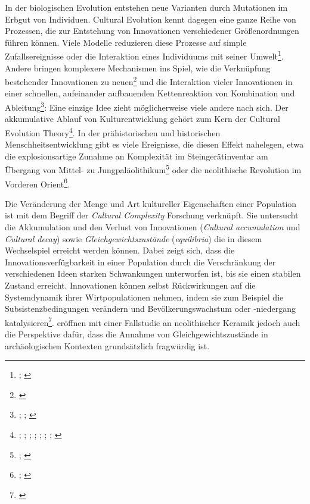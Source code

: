\documentclass[openany,twoside,twocolumn]{book}
\let\rmarkdownfootnote\footnote%
\def\footnote{\protect\rmarkdownfootnote}
\begin{document}
In der biologischen Evolution entstehen neue Varianten durch Mutationen
im Erbgut von Individuen. Cultural Evolution kennt dagegen eine ganze
Reihe von Prozessen, die zur Entstehung von Innovationen verschiedener
Größenordnungen führen können. Viele Modelle reduzieren diese Prozesse
auf simple Zufallsereignisse oder die Interaktion eines Individuums mit
seiner Umwelt\footnote{\textcite{henrich_evolution_2003};
  \textcite{rendell_why_2010}}. Andere bringen komplexere Mechanismen
ins Spiel, wie die Verknüpfung bestehender Innovationen zu
neuen\footnote{\textcite{enquist_why_2008}} und die Interaktion vieler
Innovationen in einer schnellen, aufeinander aufbauenden Kettenreaktion
von Kombination und Ableitung\footnote{\textcite{fogarty_cultural_2015};
  \textcite{kolodny_evolution_2015};
  \textcite{kolodny_game-changing_2016}}: Eine einzige Idee zieht
möglicherweise viele andere nach sich. Der akkumulative Ablauf von
Kulturentwicklung gehört zum Kern der Cultural Evolution
Theory\footnote{\textcite{basalla_evolution_1988};
  \textcite{boyd_culture_1985}; \textcite{boyd_evolutionary_1988};
  \textcite{cavalli-sforza_cultural_1981};
  \textcite{durham_adaptive_1976}; \textcite{feldman_gene-culture_1996};
  \textcite{henrich_evolution_2003}; \textcite{lumsden_genes_1981}}. In
der prähistorischen und historischen Menschheitsentwicklung gibt es
viele Ereignisse, die diesen Effekt nahelegen, etwa die explosionsartige
Zunahme an Komplexität im Steingerätinventar am Übergang von Mittel- zu
Jungpaläolithikum\footnote{\textcite{bar-yosef_nature_1998};
  \textcite{roebroeks_time_2008}} oder die neolithische Revolution im
Vorderen Orient\footnote{\textcite{gopher_when_2001};
  \textcite{veen_agricultural_2010}}.

Die Veränderung der Menge und Art kultureller Eigenschaften einer
Population ist mit dem Begriff der \emph{Cultural Complexity} Forschung
verknüpft. Sie untersucht die Akkumulation und den Verlust von
Innovationen (\emph{Cultural accumulation} und \emph{Cultural decay})
sowie \emph{Gleichgewichtszustände} (\emph{equilibria}) die in diesem
Wechselspiel erreicht werden können. Dabei zeigt sich, dass die
Innovationsverfügbarkeit in einer Population durch die Verschränkung der
verschiedenen Ideen starken Schwankungen unterworfen ist, bis sie einen
stabilen Zustand erreicht\autocite{kolodny_evolution_2015}. Innovationen
können selbst Rückwirkungen auf die Systemdynamik ihrer Wirtpopulationen
nehmen, indem sie zum Beispiel die Subsistenzbedingungen verändern und
Bevölkerungswachstum oder -niedergang katalysieren\footnote{\textcite{kolodny_game-changing_2016}}.
\textcite{crema_revealing_2016} eröffnen mit einer Fallstudie an
neolithischer Keramik jedoch auch die Perspektive dafür, dass die
Annahme von Gleichgewichtszustände in archäologischen Kontexten
grundsätzlich fragwürdig ist.
\end{document}
